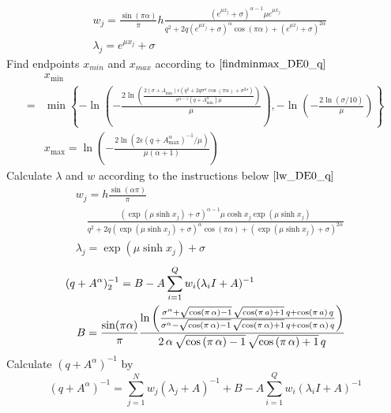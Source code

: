 \begin{breakablealgorithm}
\begin{algorithmic}[1]
		\begin{equation*}
			\begin{aligned}
				& w_j=\frac{\sin(\pi\alpha)}{\pi}h\frac{(e^{\mu x_j}+\sigma)^{\alpha-1}\mu e^{\mu x_j}}{q^2+2q(e^{\mu x_j}+\sigma)^{\alpha}\cos(\pi\alpha)+(e^{\mu x_j}+\sigma)^{2\alpha}}\\
				& \lambda_j=e^{\mu x_j}+\sigma
			\end{aligned}
		\end{equation*}
		\ELSE[Method==DE]
		\STATE  Find endpoints $x_{min}$ and $x_{max}$ according to $\eqref{findminmax_DE0_q}$\\
		\begin{equation*}
			\begin{aligned}
				&x_{\min}\\
				=&\min \left\{-\ln\left(-\frac{2\ln\left(\frac{2(\sigma+A_{\min})\epsilon(q^2+2q\sigma^{\alpha}\cos(\pi\alpha)+\sigma^{2\alpha})}{\sigma^{\alpha-1}(q+A_{\min}^{\alpha})\mu} \right)}{\mu}\right),-\ln \left(-\frac{2\ln(\sigma/10)}{\mu}\right)\right\}
				\\&x_{\max}=\ln\left(-\frac{2\ln(2\epsilon(q+A_{\max}^{\alpha})^{-1}/\mu)}{\mu(\alpha+1)}\right)
			\end{aligned}
		\end{equation*}
		\STATE  Calculate $\lambda$ and $w$ according to the instructions below $\eqref{lw_DE0_q}$
		\begin{equation*}
			\begin{aligned}
				& w_j=h\frac{\sin(\alpha\pi)}{\pi}\\
				&\quad \frac{(\exp(\mu \sinh x_j)+\sigma)^{\alpha-1}\mu \cosh x_j\exp(\mu \sinh x_j)}{q^2+2q(\exp(\mu \sinh x_j)+\sigma)^{\alpha}\cos(\pi\alpha)+(\exp(\mu \sinh x_j)+\sigma)^{2\alpha}}\\
				& \lambda_j=\exp(\mu\sinh x_j)+\sigma
			\end{aligned}
		\end{equation*}
		\ENDIF
		\STATE  {} 
		\begin{equation}
			\begin{aligned}
				&(q+A^{\alpha})^{-1}_2=B-A\sum_{i=1}^{Q} w_i(\lambda_i I+ A)^{-1}\\
				& \quad B=\frac{\sin(\pi \alpha)}{\pi}
				{{\ln \left(\frac{\sigma^{\alpha}+\sqrt{\cos \left(\pi\,\alpha \right)-1}\,\sqrt{\cos
								\left(\pi\,a\right)+1}\,q+\cos \left(\pi\,a\right)\,q}{\sigma^{\alpha}-\sqrt{\cos \left(\pi\,\alpha\right)-1}\,\sqrt{\cos \left(\pi
								\,\alpha\right)+1}\,q+\cos \left(\pi\,\alpha \right)\,q}\right)}\over{2\,\alpha\,
						\sqrt{\cos \left(\pi\,\alpha\right)-1}\,\sqrt{\cos \left(\pi\,\alpha\right)+1}
						\,q}}
			\end{aligned}
		\end{equation}
		\STATE  Calculate $(q+A^{\alpha})^{-1}$ by 
		\begin{equation}
			(q+{A}^{\alpha})^{-1}=\sum_{j=1}^{N}{w_j}(\lambda_j+A)^{-1}+B-A\sum_{i=1}^{Q} w_i(\lambda_i I+ A)^{-1}
		\end{equation}
	\end{algorithmic}
\end{breakablealgorithm}

